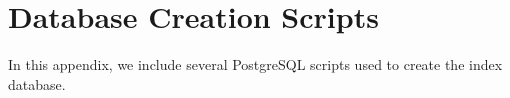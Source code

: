 \chapter{Database Creation Scripts}
In this appendix, we include several PostgreSQL scripts used to create the index database.





\newpage


\newpage

